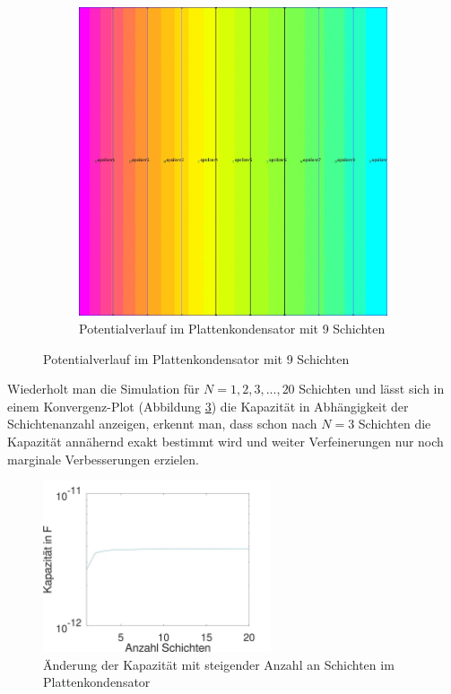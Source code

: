 \begin{figure}[h]
\begin{subfigure}[c]{0.6\textwidth}
		\includegraphics[width=\textwidth]{data/KondensatorN9}
		\caption{Potentialverlauf im Plattenkondensator mit 9 Schichten}
		\label{fig:N9}
	\end{subfigure}
	\caption{Potentialverlauf im Plattenkondensator mit 9 Schichten}
\end{figure}

Wiederholt man die Simulation für $N = 1,2,3,...,20$ Schichten und lässt sich in einem Konvergenz-Plot (Abbildung \ref{fig:semilogy}) die Kapazität in Abhängigkeit der Schichtenanzahl anzeigen, erkennt man, dass schon nach $N=3$ Schichten die Kapazität annähernd exakt bestimmt wird und weiter Verfeinerungen nur noch marginale Verbesserungen erzielen. 

\begin{figure}[tpbh]
	\includegraphics[width=0.6\textwidth]{data/Kapazitaet}
	\caption{Änderung der Kapazität mit steigender Anzahl an Schichten im Plattenkondensator}
	\label{fig:semilogy}
\end{figure}


